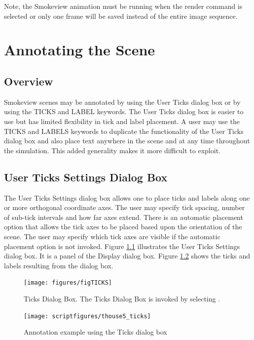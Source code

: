 \documentclass[11pt,twoside]{book}
\newcommand{\figoptions}{hbp}
\newcommand{\frameit}[1]{\fbox{\tt #1}}
\begin{document}
Note, the Smokeview animation must be running when the render command is selected or only one frame will be saved instead of the entire image sequence.

\chapter{Annotating the Scene }
\label{section:annotate} \label{subsect_features}
\section{Overview}
Smokeview scenes may be annotated by using the User Ticks dialog box or
by using the TICKS and LABEL keywords.  The User Ticks dialog box is
easier to use but  has limited flexibility in tick and label placement.
A user may use the TICKS and LABELS keywords to duplicate the functionality
of the User Ticks dialog box and also place text anywhere in the scene
and at any time throughout the simulation.  This added generality makes
it more difficult to exploit.


\section{User Ticks Settings Dialog Box}
The User Ticks Settings dialog box allows one to place
ticks and labels along one or more orthogonal coordinate axes.
The user may specify tick spacing, number of sub-tick intervals and how far  axes extend.  There is an automatic
placement option that allows the tick axes to be placed based upon
the orientation of the scene.  The user may specify which tick axes are visible if the automatic placement option is not
invoked.  Figure \ref{figTICKSdialog} illustrates the User Ticks Settings
dialog box.  It is a panel of the Display dialog box.  Figure \ref{figTICKSdialogexample} shows the ticks and labels resulting from the dialog box.

\begin{figure}[\figoptions]
\centerline{
\texttt{[image: figures/figTICKS]}
}
\caption[Ticks Dialog Box.]{Ticks Dialog Box.  The
Ticks Dialog Box is invoked by selecting
\frameit{Dialogs$>$Display}. }
\label{figTICKSdialog}
\end{figure}

\begin{figure}[\figoptions]
\begin{center}
\texttt{[image: scriptfigures/thouse5\_ticks]}
\end{center}
\caption{Annotation example using the Ticks dialog box}
\label{figTICKSdialogexample}%
\end{figure}
\end{document}
